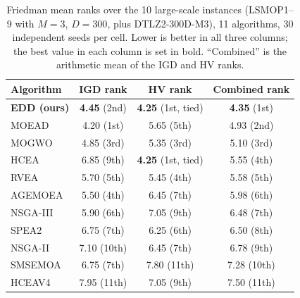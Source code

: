 %

\begin{table}[t]
\centering
\caption{Friedman mean ranks over the 10 large-scale instances
(LSMOP1--9 with $M=3$, $D=300$, plus DTLZ2-300D-M3), 11 algorithms,
30 independent seeds per cell. Lower is better in all three columns; the
best value in each column is set in bold. ``Combined'' is the arithmetic
mean of the IGD and HV ranks.}
\label{tab:ranks}
\begin{tabular}{lccc}
\toprule
Algorithm & IGD rank & HV rank & Combined rank \\
\midrule
\textbf{EDD (ours)} & \textbf{4.45} (2nd) & \textbf{4.25} (1st, tied) & \textbf{4.35} (1st) \\
MOEAD               & 4.20 (1st)          & 5.65 (5th)               & 4.93 (2nd) \\
MOGWO               & 4.85 (3rd)          & 5.35 (3rd)               & 5.10 (3rd) \\
HCEA                & 6.85 (9th)          & \textbf{4.25} (1st, tied) & 5.55 (4th) \\
RVEA                & 5.70 (5th)          & 5.45 (4th)               & 5.58 (5th) \\
AGEMOEA             & 5.50 (4th)          & 6.45 (7th)               & 5.98 (6th) \\
NSGA-III            & 5.90 (6th)          & 7.05 (9th)               & 6.48 (7th) \\
SPEA2               & 6.75 (7th)          & 6.25 (6th)               & 6.50 (8th) \\
NSGA-II             & 7.10 (10th)         & 6.45 (7th)               & 6.78 (9th) \\
SMSEMOA             & 6.75 (7th)          & 7.80 (11th)              & 7.28 (10th) \\
HCEAV4              & 7.95 (11th)         & 7.05 (9th)               & 7.50 (11th) \\
\bottomrule
\end{tabular}
\end{table}

